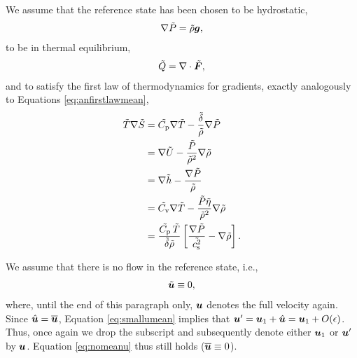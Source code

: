 \documentclass[12pt]{article}
\newcommand{\vecf}{\bm{F}}
\begin{document}
We assume that the reference state has been chosen to be hydrostatic,
\begin{align}\label{eq:refhydro}
	\nabla \tilde{P} = \tilde{\rho}\bm{g},
\end{align}
to be in thermal equilibrium,
\begin{align}\label{eq:refthermalequil}
	\heattilde = \Div\tilde{\vecf},
\end{align}
and to satisfy the first law of thermodynamics for gradients, exactly analogously to Equations \eqref{eq:anfirstlawmean},
  \begin{subequations}\label{eq:reffirstlawmean}
	\begin{align}
		\tilde{T} \nabla\tilde{S} &= \tilde{C_{\rm{p}}} \nabla\tilde{T} - \frac{\tilde{\delta}}{\tilde{\rho}} \nabla\tilde{P}\label{eq:reffirstlawmeantmpprs}\\
		&= \nabla\tilde{U} - \frac{\tilde{P}}{\tilde{\rho}^2}\nabla\tilde{\rho} \label{eq:reffirstlawmeaninterho}\\
		&= \nabla \tilde{h} - \frac{\nabla\tilde{P}}{\tilde{\rho}}\label{eq:reffirstlawmeanenthprs}\\
		&= \tilde{C_{\rm{v}}} \nabla\tilde{T} - \frac{\tilde{P}\tilde{\eta}}{\tilde{\rho}^2}\nabla\tilde{\rho}\label{eq:reffirstlawmeantmprho}\\		
		&= \frac{\tilde{C_{\rm{p}}}\, \tilde{T}}{\tilde{\delta}\tilde{\rho}}\left[\frac{\nabla\tilde{P}}{\tilde{c_{\rm s}^2}}-\nabla\tilde{\rho}\right].\label{eq:reffirstlawmeanprsrho}
	\end{align}
\end{subequations}

We assume that there is no flow in the reference state, i.e., 
\begin{align}\label{eq:norefu}
	\tilde{\bm{u}}\equiv0,
\end{align}
where, until the end of this paragraph only, $\bm{u}$ denotes the full velocity again. Since $\hat{\bm{u}}=\overline{\bm{u}}$, Equation \eqref{eq:smallumean} implies that $\bm{u}^\prime={\bm{u}}_1 + \hat{\bm{u}} = {\bm{u}}_1 + O(\epsilon)$. Thus, once again we drop the subscript and subsequently denote either ${\bm{u}}_1$ or $\bm{u}^\prime$ by $\bm{u}$. Equation \eqref{eq:nomeanu} thus still holds ($\overline{\bm{u}}\equiv0$). 
\end{document}
